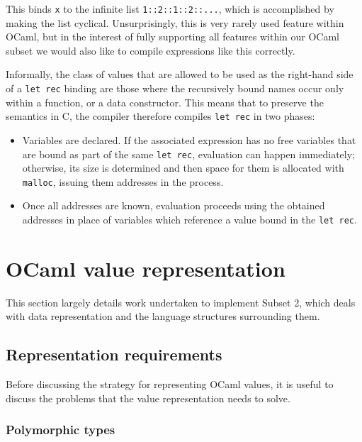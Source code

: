 This binds \texttt{x} to the infinite list \texttt{1::2::1::2::...}, which is
accomplished by making the list cyclical. Unsurprisingly, this is very rarely
used feature within OCaml, but in the interest of fully supporting all features
within our OCaml subset we would also like to compile expressions like this
correctly.

Informally, the class of values that are allowed to be used as the right-hand
side of a \texttt{let rec} binding are those where the recursively bound names
occur only within a function, or a data constructor. This means that to preserve
the semantics in C, the compiler therefore compiles \texttt{let rec} in two
phases:

\begin{itemize} 
    
\item Variables are declared. If the associated expression has no free variables
    that are bound as part of the same \texttt{let rec}, evaluation can happen
    immediately; otherwise, its size is determined and then space for them is
    allocated with \texttt{malloc}, issuing them addresses in the process.        

\item Once all addresses are known, evaluation proceeds using the obtained
    addresses in place of variables which reference a value bound in the
    \texttt{let rec}.

\end{itemize}

\section{OCaml value representation} \label{value-repr}

This section largely details work undertaken to implement Subset 2, which deals 
with data representation and the language structures surrounding them.

\subsection{Representation requirements}

Before discussing the strategy for representing OCaml values, it is useful to
discuss the problems that the value representation needs to solve.

\subsubsection{Polymorphic types}

